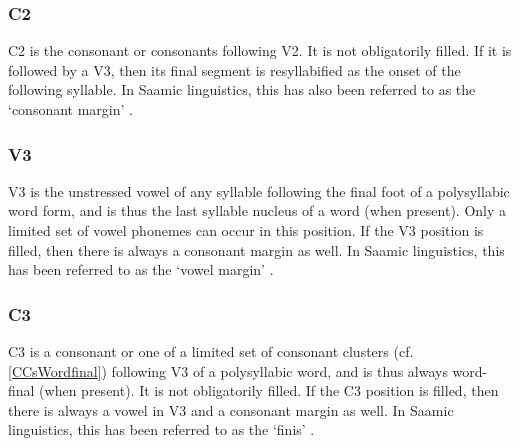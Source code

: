 \subsubsection{C2}\label{CMarg}
{C2} is the consonant or consonants following V2. It is not obligatorily filled. If it is followed by a V3, then its final segment is resyllabified as the onset of the following syllable. 
In Saamic linguistics, this has also been referred to as the ‘consonant margin’ \citep[cf.][39]{Sammallahti1998}.

\subsubsection{V3}\label{v3}
{V3} is the unstressed vowel of any syllable following the final foot of a polysyllabic word form, and is thus the last syllable nucleus of a word (when present). Only a limited set of vowel phonemes can occur in this position. If the V3 position is filled, then there is always a consonant margin as well.  
In Saamic linguistics, this has been referred to as the ‘vowel margin’ \citep[cf.][39]{Sammallahti1998}.

\subsubsection{C3}\label{c3}
{C3} is a consonant or one of a limited set of consonant clusters (cf. \SEC\ref{CCsWordfinal}) following V3 of a polysyllabic word, and is thus always word-final (when present). It is not obligatorily filled. If the C3 position is filled, then there is always a vowel in V3 and a consonant margin as well. 
In Saamic linguistics, this has been referred to as the ‘finis’ \citep[cf.][39]{Sammallahti1998}.



